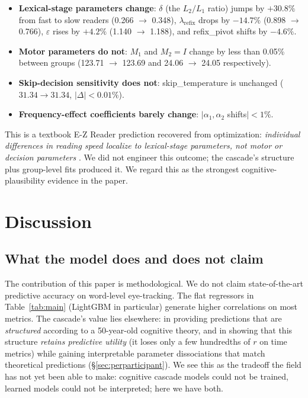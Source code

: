 \documentclass[11pt]{article}
\begin{document}
\begin{itemize}\setlength\itemsep{-2pt}
\item \textbf{Lexical-stage parameters change}: $\delta$ (the $L_2/L_1$ ratio) jumps by $+30.8\%$ from fast to slow readers (0.266 $\to$ 0.348), $\lambda_{\text{refix}}$ drops by $-14.7\%$ (0.898 $\to$ 0.766), $\varepsilon$ rises by $+4.2\%$ (1.140 $\to$ 1.188), and refix\_pivot shifts by $-4.6\%$.
\item \textbf{Motor parameters do not}: $M_1$ and $M_2 = I$ change by less than 0.05\% between groups (123.71 $\to$ 123.69 and 24.06 $\to$ 24.05 respectively).
\item \textbf{Skip-decision sensitivity does not}: skip\_temperature is unchanged ($31.34 \to 31.34$, $|\Delta| < 0.01\%$).
\item \textbf{Frequency-effect coefficients barely change}: $|\alpha_1, \alpha_2$ shifts$| < 1\%$.
\end{itemize}

This is a textbook E-Z Reader prediction recovered from optimization: \emph{individual differences in reading speed localize to lexical-stage parameters, not motor or decision parameters} \citep{reichle2009ezreader}. We did not engineer this outcome; the cascade's structure plus group-level fits produced it. We regard this as the strongest cognitive-plausibility evidence in the paper.

\section{Discussion}\label{sec:discussion}

\subsection{What the model does and does not claim}\label{sec:claims}

The contribution of this paper is methodological. We do not claim state-of-the-art predictive accuracy on word-level eye-tracking. The flat regressors in Table~\ref{tab:main} (LightGBM in particular) generate higher correlations on most metrics. The cascade's value lies elsewhere: in providing predictions that are \emph{structured} according to a 50-year-old cognitive theory, and in showing that this structure \emph{retains predictive utility} (it loses only a few hundredths of $r$ on time metrics) while gaining interpretable parameter dissociations that match theoretical predictions (\S\ref{sec:perparticipant}). We see this as the tradeoff the field has not yet been able to make: cognitive cascade models could not be trained, learned models could not be interpreted; here we have both.
\end{document}
